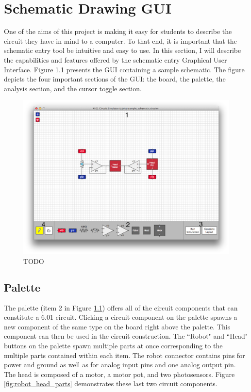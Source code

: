 
\chapter{Schematic Drawing GUI}

One of the aims of this project is making it easy for students to describe the
circuit they have in mind to a computer. To that end, it is important that the
schematic entry tool be intuitive and easy to use. In this section, I will
describe the capabilities and features offered by the schematic entry Graphical
User Interface. Figure \ref{fig:gui} presents the GUI containing a sample
schematic. The figure depicts the four important sections of the GUI: the board,
the palette, the analysis section, and the cursor toggle section.

\begin{figure}
\begin{center}
\includegraphics[width=\textwidth]{Images/gui.png}
\caption{TODO}
\label{fig:gui}
\end{center}
\end{figure}

\section{Palette}

The palette (item $2$ in Figure \ref{fig:gui}) offers all of the circuit
components that can constitute a 6.01 circuit. Clicking a circuit component on
the palette spawns a new component of the same type on the board right above
the palette. This component can then be used in the circuit construction. The
``Robot" and ``Head" buttons on the palette spawn multiple parts at once
corresponding to the multiple parts contained within each item. The robot
connector contains pins for power and ground as well as for analog input pins
and one analog output pin. The head is composed of a motor, a motor pot, and
two photosensors. Figure \ref{fig:robot_head_parts} demonstrates these last two
circuit components.

